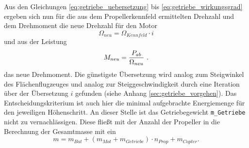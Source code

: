 Aus den Gleichungen \eqref{eq:getriebe_uebersetzung} bis \eqref{eq:getriebe_wirkungsgrad} ergeben sich nun für die aus dem Propellerkennfeld ermittelten Drehzahl und dem Drehmoment die neue Drehzahl für den Motor
\begin{equation}
	\Omega_{neu} = \Omega_{Kennfeld}\cdot i
\end{equation}
und aus der Leistung
\begin{equation}
	M_{neu} = \frac{P_{ab}}{\Omega_{neu}} ~\text{.}
\end{equation}
das neue Drehmoment.
Die günstigste Übersetzung wird analog zum Steigwinkel des Flächenflugzeuges und analog zur Steiggeschwindigkeit durch eine Iteration über der Übersetzung \ensuremath{i} gefunden (siehe Anhang \ref{sec:getriebe_vorgehen}). Das Entscheidungskriterium ist auch hier die minimal aufgebrachte Energiemenge für den jeweiligen Höhenschritt. An dieser Stelle ist das Getriebegewicht \texttt{m\_Getriebe} nicht zu vernachlässigen. Diese fließt mit der Anzahl der Propeller in die Berechnung der Gesamtmasse mit ein
\begin{equation}
	m = m_{Bat} + (m_{Mot} + m_{Getriebe})\cdot n_{Prop} + m_{Copter} .
\end{equation}

